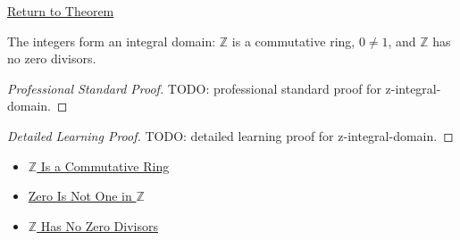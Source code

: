 \newpage
{}
\label{prf:z-integral-domain}

\begin{remark*}[Return]
\hyperref[thm:z-integral-domain]{Return to Theorem}
\end{remark*}

\begin{theorem*}
The integers form an integral domain: $\mathbb{Z}$ is a commutative ring,
$0\ne 1$, and $\mathbb{Z}$ has no zero divisors.
\end{theorem*}

\begin{proof}[Professional Standard Proof]
\LRAProofBodyStart
TODO: professional standard proof for z-integral-domain.
\end{proof}

\begin{proof}[Detailed Learning Proof]
\LRAProofBodyStart
TODO: detailed learning proof for z-integral-domain.
\end{proof}

\begin{remark*}
\end{remark*}

\begin{dependencies}
\begin{itemize}
  \item \hyperref[thm:z-commutative-ring]{$\mathbb{Z}$ Is a Commutative Ring}
  \item \hyperref[thm:zero-not-one-in-z]{Zero Is Not One in $\mathbb{Z}$}
  \item \hyperref[thm:z-has-no-zero-divisors]{$\mathbb{Z}$ Has No Zero Divisors}
\end{itemize}
\end{dependencies}

\clearpage
